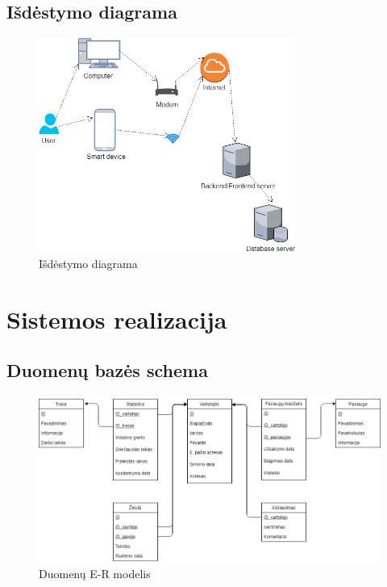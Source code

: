 \documentclass[oneside]{VUMIFPSkursinis}
\begin{document}
	\subsection{Išdėstymo diagrama}
			\begin{figure}[h]
    				\centering
    				\includegraphics[width=0.75\textwidth]{Deployment.png}
    				\caption{Išdėstymo diagrama}
			\end{figure}

\section{Sistemos realizacija}
	\subsection{Duomenų bazės schema}
	\begin{figure}[h]
    				\centering
    				\includegraphics[width=1\textwidth]{Database_2.png}
    				\caption{Duomenų E-R modelis}
			\end{figure}
			
\end{document}
